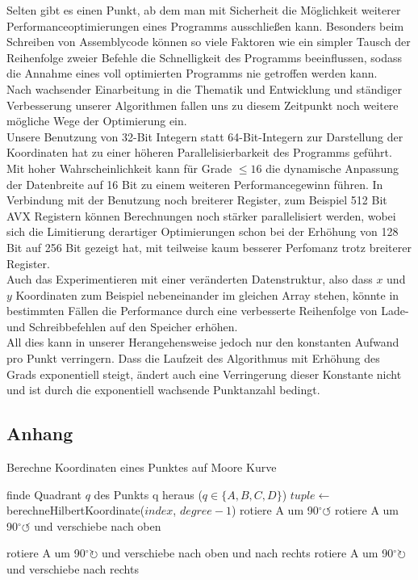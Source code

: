 \documentclass[course=erap]{aspdoc}
\begin{document}
Selten gibt es einen Punkt, ab dem man mit Sicherheit die Möglichkeit weiterer Performanceoptimierungen eines Programms ausschließen kann. Besonders beim Schreiben von Assemblycode können so viele Faktoren wie ein simpler Tausch der Reihenfolge zweier Befehle die Schnelligkeit des Programms beeinflussen, sodass die Annahme eines voll optimierten Programms nie getroffen werden kann. \\
Nach wachsender Einarbeitung in die Thematik und Entwicklung und ständiger Verbesserung unserer Algorithmen fallen uns zu diesem Zeitpunkt noch weitere mögliche Wege der Optimierung ein.\\
Unsere Benutzung von 32-Bit Integern statt 64-Bit-Integern zur Darstellung der Koordinaten hat zu einer höheren Parallelisierbarkeit des Programms geführt. Mit hoher Wahrscheinlichkeit kann für Grade $\leq 16$ die dynamische Anpassung der Datenbreite auf 16 Bit zu einem weiteren Performancegewinn führen. In Verbindung mit der Benutzung noch breiterer Register, zum Beispiel 512 Bit AVX Registern können Berechnungen noch stärker parallelisiert werden, wobei sich die  Limitierung derartiger Optimierungen schon bei der Erhöhung von 128 Bit auf 256 Bit gezeigt hat, mit teilweise kaum besserer Perfomanz trotz breiterer Register. \\
Auch das Experimentieren mit einer veränderten Datenstruktur, also dass $x$ und $y$ Koordinaten zum Beispiel nebeneinander im gleichen Array stehen, könnte in bestimmten Fällen die Performance durch eine verbesserte Reihenfolge von Lade- und Schreibbefehlen auf den Speicher erhöhen. \\
All dies kann in unserer Herangehensweise jedoch nur den konstanten Aufwand pro Punkt verringern. Dass die Laufzeit des Algorithmus mit Erhöhung des Grads exponentiell steigt, ändert auch eine Verringerung dieser Konstante nicht und ist durch die exponentiell wachsende Punktanzahl bedingt.
\FloatBarrier
\subsection{Anhang}

\begin{algorithm}[h]
\scriptsize
\begin{algorithmic}
\caption{Berechne Koordinaten eines Punktes auf Moore Kurve}
\label{moore:iterative}
	\State finde Quadrant $q$ des Punkts q heraus ($q \in \{A, B, C, D\}$)
	\State $tuple \leftarrow$ berechneHilbertKoordinate($index$, $degree-1$)
	 rotiere A um 90$^{\circ} \circlearrowleft$
	 rotiere A um 90$^{\circ}\circlearrowleft$ und verschiebe nach oben
		
	 rotiere A um 90$^{\circ}\circlearrowright$ und verschiebe nach oben und nach rechts
	 rotiere A um  90$^{\circ} \circlearrowright$ und verschiebe nach rechts
	\EndIf
\EndFunction
{}
	\State [...]
\EndFunction
\end{algorithmic}
\end{algorithm}
\end{document}
